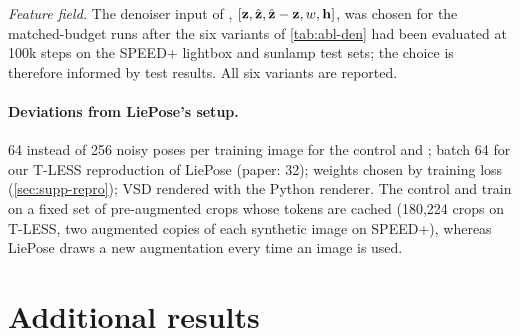 \emph{Feature field.} The denoiser input of \method, $[\mathbf{z},\hat{\mathbf{z}},\hat{\mathbf{z}}-\mathbf{z},w,\mathbf{h}]$, was chosen for the matched-budget runs after
the six variants of \cref{tab:abl-den} had been evaluated at 100k steps on the SPEED+ lightbox and sunlamp test sets; the choice is
therefore informed by test results. All six variants are reported.

\paragraph{Deviations from LiePose's setup.}
64 instead of 256 noisy poses per training image for the control and \method; batch 64 for our T-LESS reproduction of LiePose
(paper: 32); weights chosen by training loss (\cref{sec:supp-repro}); VSD rendered with the Python renderer. The control and
\method train on a fixed set of pre-augmented crops whose tokens are cached (180,224 crops on T-LESS, two augmented copies of each
synthetic image on SPEED+), whereas LiePose draws a new augmentation every time an image is used.

\section{Additional results}
\label{sec:supp-results}

